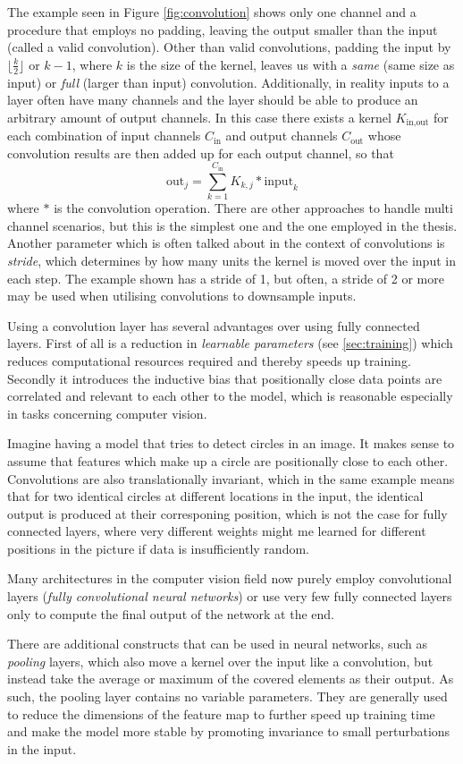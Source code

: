 The example seen in Figure \ref*{fig:convolution} shows only one channel and a procedure that employs no padding, leaving the output smaller than the input (called a valid convolution). Other than valid convolutions, padding the input by $\lfloor\frac{k}{2}\rfloor$ or $k - 1$, where $k$ is the size of the kernel, leaves us with a \emph{same} (same size as input) or \emph{full} (larger than input) convolution. Additionally, in reality inputs to a layer often have many channels and the layer should be able to produce an arbitrary amount of output channels. In this case there exists a kernel $K_{\text{in}, \text{out}}$ for each combination of input channels $C_\text{in}$ and output channels $C_{\text{out}}$ whose convolution results are then added up for each output channel, so that
$$
    \text{out}_j = \sum_{k=1}^{C_\text{in}} K_{k,j} * \text{input}_k
$$
where $*$ is the convolution operation. There are other approaches to handle multi channel scenarios, but this is the simplest one and the one employed in the thesis.
Another parameter which is often talked about in the context of convolutions is \emph{stride}, which determines by how many units the kernel is moved over the input in each step. The example shown has a stride of 1, but often, a stride of 2 or more may be used when utilising convolutions to downsample inputs.

Using a convolution layer has several advantages over using fully connected layers. First of all is a reduction in \emph{learnable parameters} (see \ref*{sec:training}) which reduces computational resources required and thereby speeds up training. Secondly it introduces the inductive bias that positionally close data points are correlated and relevant to each other to the model, which is reasonable especially in tasks concerning computer vision. 

Imagine having a model that tries to detect circles in an image. It makes sense to assume that features which make up a circle are positionally close to each other. Convolutions are also translationally invariant, which in the same example means that for two identical circles at different locations in the input, the identical output is produced at their corresponing position, which is not the case for fully connected layers, where very different weights might me learned for different positions in the picture if data is insufficiently random.

Many architectures in the computer vision field now purely employ convolutional layers (\emph{fully convolutional neural networks}) or use very few fully connected layers only to compute the final output of the network at the end. 

There are additional constructs that can be used in neural networks, such as \emph{pooling} layers, which also move a kernel over the input like a convolution, but instead take the average or maximum of the covered elements as their output. As such, the pooling layer contains no variable parameters. They are generally used to reduce the dimensions of the feature map to further speed up training time and make the model more stable by promoting invariance to small perturbations in the input.
